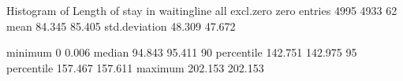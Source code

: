 \documentclass[letterpaper,10pt,english]{sphinxmanual}
\begin{document}
\begin{sphinxVerbatim}[commandchars=\\\{\}]
Histogram of Length of stay in waitingline
                        all    excl.zero         zero
\PYGZhy{}\PYGZhy{}\PYGZhy{}\PYGZhy{}\PYGZhy{}\PYGZhy{}\PYGZhy{}\PYGZhy{}\PYGZhy{}\PYGZhy{}\PYGZhy{}\PYGZhy{}\PYGZhy{}\PYGZhy{} \PYGZhy{}\PYGZhy{}\PYGZhy{}\PYGZhy{}\PYGZhy{}\PYGZhy{}\PYGZhy{}\PYGZhy{}\PYGZhy{}\PYGZhy{}\PYGZhy{}\PYGZhy{} \PYGZhy{}\PYGZhy{}\PYGZhy{}\PYGZhy{}\PYGZhy{}\PYGZhy{}\PYGZhy{}\PYGZhy{}\PYGZhy{}\PYGZhy{}\PYGZhy{}\PYGZhy{} \PYGZhy{}\PYGZhy{}\PYGZhy{}\PYGZhy{}\PYGZhy{}\PYGZhy{}\PYGZhy{}\PYGZhy{}\PYGZhy{}\PYGZhy{}\PYGZhy{}\PYGZhy{}
entries            4995         4933           62
mean                 84.345       85.405
std.deviation        48.309       47.672

minimum               0            0.006
median               94.843       95.411
90\PYGZpc{} percentile      142.751      142.975
95\PYGZpc{} percentile      157.467      157.611
maximum             202.153      202.153


\end{sphinxVerbatim}
\end{document}
